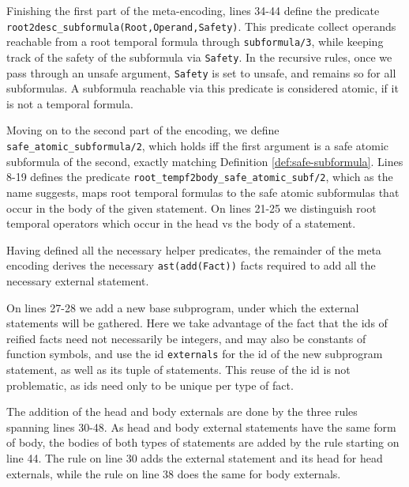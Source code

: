 Finishing the first part of the meta-encoding, lines 34-44 define the
predicate \verb|root2desc_subformula(Root,Operand,Safety)|. This
predicate collect operands reachable from a root temporal formula
through \verb|subformula/3|, while keeping track of the safety of the
subformula via \verb|Safety|. In the recursive rules, once we pass
through an unsafe argument, \verb|Safety| is set to unsafe, and
remains so for all subformulas. A subformula reachable via this
predicate is considered atomic, if it is not a temporal formula.

Moving on to the second part of the encoding, we define
\texttt{safe\_atomic\_subformula/2}, which holds iff the first argument
is a safe atomic subformula of the second, exactly matching Definition
\ref{def:safe-subformula}. Lines 8-19 defines the predicate
\texttt{root\_tempf2body\_safe\_atomic\_subf/2}, which as the name
suggests, maps root temporal formulas to the safe atomic subformulas
that occur in the body of the given statement. On lines 21-25 we
distinguish root temporal operators which occur in the head vs the
body of a statement.

Having defined all the necessary helper predicates, the remainder of
the meta encoding derives the necessary \texttt{ast(add(Fact))} facts
required to add all the necessary external statement.

On lines 27-28 we add a new base subprogram, under which the external
statements will be gathered. Here we take advantage of the fact that
the ids of reified facts need not necessarily be integers, and may
also be constants of function symbols, and use the id
\texttt{externals} for the id of the new subprogram statement, as well
as its tuple of statements. This reuse of the id is not problematic,
as ids need only to be unique per type of fact.

The addition of the head and body externals are done by the three
rules spanning lines 30-48. As head and body external statements have
the same form of body, the bodies of both types of statements are
added by the rule starting on line 44. The rule on line 30 adds the
external statement and its head for head externals, while the rule on
line 38 does the same for body externals.


